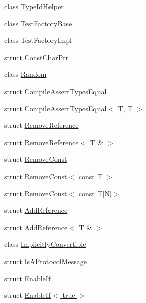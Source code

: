 \begin{DoxyCompactItemize}
\item 
class \hyperlink{classtesting_1_1internal_1_1_type_id_helper}{Type\-Id\-Helper}
\item 
class \hyperlink{classtesting_1_1internal_1_1_test_factory_base}{Test\-Factory\-Base}
\item 
class \hyperlink{classtesting_1_1internal_1_1_test_factory_impl}{Test\-Factory\-Impl}
\item 
struct \hyperlink{structtesting_1_1internal_1_1_const_char_ptr}{Const\-Char\-Ptr}
\item 
class \hyperlink{classtesting_1_1internal_1_1_random}{Random}
\item 
struct \hyperlink{structtesting_1_1internal_1_1_compile_assert_types_equal}{Compile\-Assert\-Types\-Equal}
\item 
struct \hyperlink{structtesting_1_1internal_1_1_compile_assert_types_equal_3_01_t_00_01_t_01_4}{Compile\-Assert\-Types\-Equal$<$ T, T $>$}
\item 
struct \hyperlink{structtesting_1_1internal_1_1_remove_reference}{Remove\-Reference}
\item 
struct \hyperlink{structtesting_1_1internal_1_1_remove_reference_3_01_t_01_6_01_4}{Remove\-Reference$<$ T \& $>$}
\item 
struct \hyperlink{structtesting_1_1internal_1_1_remove_const}{Remove\-Const}
\item 
struct \hyperlink{structtesting_1_1internal_1_1_remove_const_3_01const_01_t_01_4}{Remove\-Const$<$ const T $>$}
\item 
struct \hyperlink{structtesting_1_1internal_1_1_remove_const_3_01const_01_t[_n]_4}{Remove\-Const$<$ const T\mbox{[}\-N\mbox{]}$>$}
\item 
struct \hyperlink{structtesting_1_1internal_1_1_add_reference}{Add\-Reference}
\item 
struct \hyperlink{structtesting_1_1internal_1_1_add_reference_3_01_t_01_6_01_4}{Add\-Reference$<$ T \& $>$}
\item 
class \hyperlink{classtesting_1_1internal_1_1_implicitly_convertible}{Implicitly\-Convertible}
\item 
struct \hyperlink{structtesting_1_1internal_1_1_is_a_protocol_message}{Is\-A\-Protocol\-Message}
\item 
struct \hyperlink{structtesting_1_1internal_1_1_enable_if}{Enable\-If}
\item 
struct \hyperlink{structtesting_1_1internal_1_1_enable_if_3_01true_01_4}{Enable\-If$<$ true $>$}
\item 

\end{DoxyCompactItemize}
